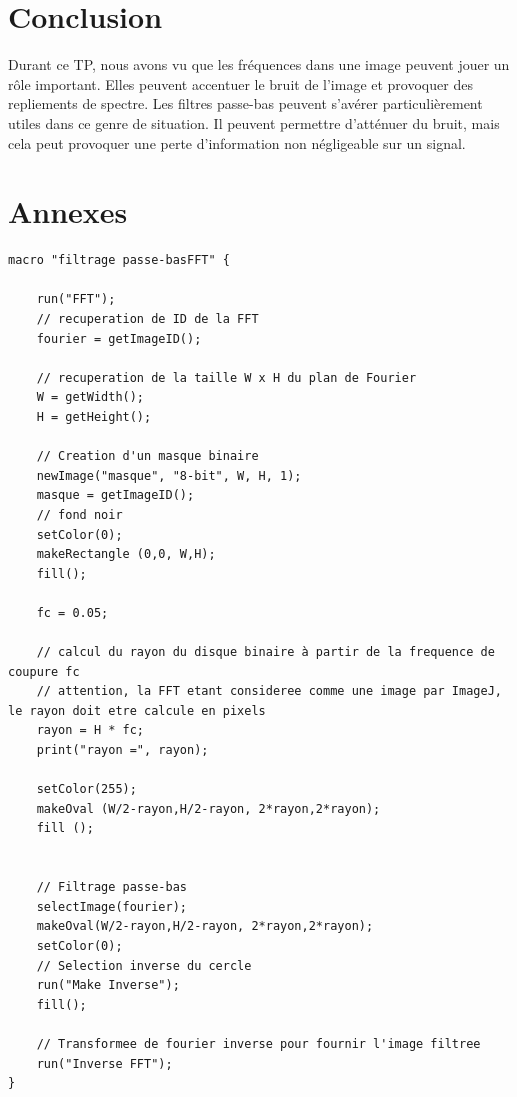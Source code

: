 \documentclass[a4paper,11pt]{article}
\begin{document}
  \section{Conclusion}
  Durant ce TP, nous avons vu que les fréquences dans une image peuvent jouer un rôle important. Elles peuvent
  accentuer le bruit de l'image et provoquer des repliements de spectre. Les filtres passe-bas peuvent s'avérer
  particulièrement utiles dans ce genre de situation. Il peuvent permettre d'atténuer du bruit, mais cela peut
  provoquer une perte d'information non négligeable sur un signal.
  
  \newpage
  \section{Annexes}
  \begin{lstlisting}[caption=Macro d'atténuation du phénomène de Moiré]
macro "filtrage passe-basFFT" {

    run("FFT");
    // recuperation de ID de la FFT
    fourier = getImageID();

    // recuperation de la taille W x H du plan de Fourier
    W = getWidth();
    H = getHeight();

    // Creation d'un masque binaire
    newImage("masque", "8-bit", W, H, 1);
    masque = getImageID();
    // fond noir
    setColor(0);
    makeRectangle (0,0, W,H);
    fill();

    fc = 0.05;

    // calcul du rayon du disque binaire à partir de la frequence de coupure fc
    // attention, la FFT etant consideree comme une image par ImageJ, le rayon doit etre calcule en pixels
    rayon = H * fc;
    print("rayon =", rayon);

    setColor(255);
    makeOval (W/2-rayon,H/2-rayon, 2*rayon,2*rayon);
    fill ();


    // Filtrage passe-bas
    selectImage(fourier);
    makeOval(W/2-rayon,H/2-rayon, 2*rayon,2*rayon);
    setColor(0);
    // Selection inverse du cercle
    run("Make Inverse");
    fill();

    // Transformee de fourier inverse pour fournir l'image filtree
    run("Inverse FFT");
}
  \end{lstlisting}
\end{document}
